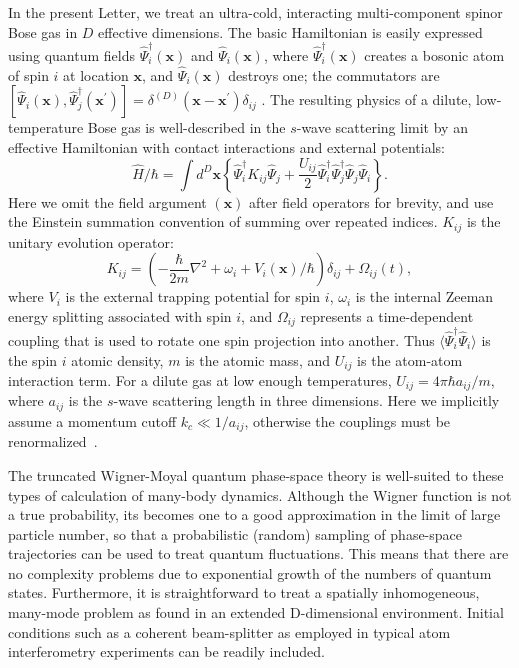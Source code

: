\documentclass[aps,prl,twocolumn,showpacs,amsmath,amssymb,superscriptaddress,flushbottom,noraggedfooter]{revtex4-1}
\newcommand{\xvec}{\boldsymbol{x}}
\begin{document}
In the present Letter, we treat an ultra-cold,
interacting multi-component spinor Bose gas in $D$ effective dimensions.
The basic Hamiltonian is easily expressed using quantum fields
$\widehat{\Psi}_{i}^{\dagger}(\xvec)$ and $\widehat{\Psi}_{i}(\xvec)$,
where $\widehat{\Psi}_{i}^{\dagger}(\xvec)$ creates a bosonic atom of spin $i$
at location $\xvec$, and $\widehat{\Psi}_{i}(\xvec)$ destroys one;
the commutators are
$[\widehat{\Psi}_{i}(\xvec),\widehat{\Psi}_{j}^{\dagger}(\xvec^\prime)] =
\delta^{(D)}(\xvec-\xvec^\prime)\delta_{ij}\,\,.$
The resulting physics of a dilute, low-temperature Bose gas
is well-described in the $s$-wave scattering limit by an effective Hamiltonian
with contact interactions and external potentials:
\begin{equation}
	\hat{H} / \hbar = \int d^{D}\xvec \left\{
		\widehat{\Psi}_{i}^{\dagger} K_{ij} \widehat{\Psi}_{j} +
		\frac{U_{ij}}{2} \widehat{\Psi}_{i}^{\dagger} \widehat{\Psi}_{j}^{\dagger}
		\widehat{\Psi}_{j} \widehat{\Psi}_{i}
	\right\}.
\end{equation}
Here we omit the field argument $(\xvec)$ after field operators for brevity,
and use the Einstein summation convention of summing over repeated indices.
$K_{ij}$ is the unitary evolution operator:
\begin{equation}
	K_{ij} = \left( -\frac{\hbar}{2m} \nabla^2 + \omega_i + V_i(\xvec) / \hbar \right) \delta_{ij} +
		\Omega_{ij}(t),
\end{equation}
where $V_{i}$ is the external trapping potential for spin $i$,
$\omega_{i}$ is the internal Zeeman energy splitting associated with spin $i$,
and $\Omega_{ij}$ represents a time-dependent coupling
that is used to rotate one spin projection into another.
Thus $\langle \widehat{\Psi}_{i}^{\dagger} \widehat{\Psi}_{i} \rangle$
is the spin $i$ atomic density, $m$ is the atomic mass,
and $U_{ij}$ is the atom-atom interaction term.
For a dilute gas at low enough temperatures,
$U_{ij}=4\pi\hbar a_{ij} / m$, where $a_{ij}$ is the $s$-wave scattering length in three dimensions.
Here we implicitly assume a momentum cutoff $k_{c} \ll 1 / a_{ij}$,
otherwise the couplings must be renormalized~\cite{Sinatra2002}.

The truncated Wigner-Moyal quantum phase-space theory is well-suited
to these types of calculation of many-body dynamics.
Although the Wigner function is not a true probability,
its becomes one to a good approximation in the limit of large particle number,
so that a probabilistic (random) sampling of phase-space trajectories
can be used to treat quantum fluctuations.
This means that there are no complexity problems due to exponential growth
of the numbers of quantum states.
Furthermore, it is straightforward to treat a spatially inhomogeneous,
many-mode problem as found in an extended D-dimensional environment.
Initial conditions such as a coherent beam-splitter
as employed in typical atom interferometry experiments can be readily included.
\end{document}

